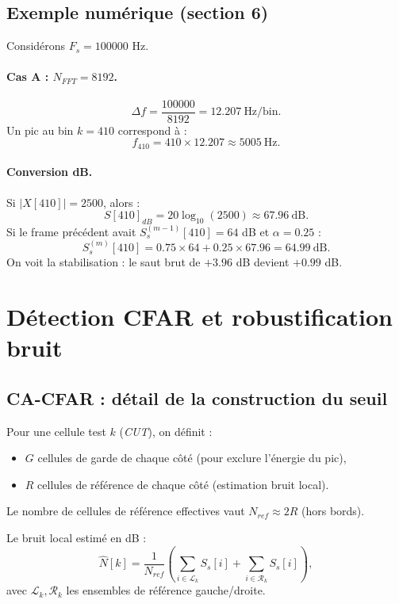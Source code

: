 \documentclass[a4paper,11pt]{article}
\begin{document}
\subsection{Exemple num\'erique (section 6)}

Consid\'erons \(F_s=100000\) Hz.

\paragraph{Cas A : \(N_{FFT}=8192\).}
\[
\Delta f = \frac{100000}{8192}=12.207\ \text{Hz/bin}.
\]
Un pic au bin \(k=410\) correspond \`a :
\[
f_{410}=410\times 12.207 \approx 5005\ \text{Hz}.
\]

\paragraph{Conversion dB.}
Si \(|X[410]|=2500\), alors :
\[
S[410]_{dB}=20\log_{10}(2500)\approx 67.96\ \text{dB}.
\]
Si le frame pr\'ec\'edent avait \(S_s^{(m-1)}[410]=64\) dB et \(\alpha=0.25\) :
\[
S_s^{(m)}[410]=0.75\times64+0.25\times67.96
=64.99\ \text{dB}.
\]
On voit la stabilisation : le saut brut de \(+3.96\) dB devient \(+0.99\) dB.

\section{D\'etection CFAR et robustification bruit}

\subsection{CA-CFAR : d\'etail de la construction du seuil}

Pour une cellule test \(k\) (\emph{CUT}), on d\'efinit :
\begin{itemize}[leftmargin=2em]
  \item \(G\) cellules de garde de chaque c\^ot\'e (pour exclure l'\'energie du pic),
  \item \(R\) cellules de r\'ef\'erence de chaque c\^ot\'e (estimation bruit local).
\end{itemize}

Le nombre de cellules de r\'ef\'erence effectives vaut \(N_{ref}\approx 2R\) (hors bords).

Le bruit local estim\'e en dB :
\[
\widehat{N}[k]=\frac{1}{N_{ref}}
\left(\sum_{i\in\mathcal{L}_k}S_s[i]+\sum_{i\in\mathcal{R}_k}S_s[i]\right),
\]
avec \(\mathcal{L}_k,\mathcal{R}_k\) les ensembles de r\'ef\'erence gauche/droite.
\end{document}
